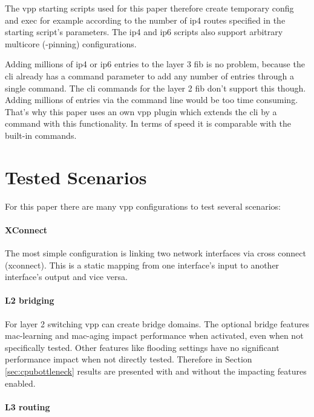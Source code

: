 The \Ac{vpp} starting scripts used for this paper therefore create
temporary \Ac{config} and \Ac{exec} for example according to the
number of \Ac{ip4} routes specified in the starting script's
parameters. The \Ac{ip4} and \Ac{ip6} scripts also support arbitrary
multicore (-pinning) configurations.


Adding millions of \Ac{ip4} or \Ac{ip6} entries to the layer 3
\Ac{fib} is no problem, because the \Ac{cli} already has a command
parameter to add any number of entries through a single command. The
\Ac{cli} commands for the layer 2 \Ac{fib} don't support this though.
Adding millions of entries via the command line would be too time
consuming. That's why this paper uses an own \Ac{vpp} plugin which
extends the \Ac{cli} by a command with this functionality. In terms of
speed it is comparable with the built-in commands.



\section{Tested Scenarios}

For this paper there are many \Ac{vpp} configurations to test several
scenarios:

\paragraph{XConnect} 

The most simple configuration is linking two network interfaces via
cross connect (xconnect). This is a static mapping from one
interface's input to another interface's output and vice versa.

\paragraph{L2 bridging}

For layer 2 switching \Ac{vpp} can create bridge domains. The optional
bridge features mac-learning and mac-aging impact performance when
activated, even when not specifically tested. Other features like
flooding settings have no significant performance impact when not
directly tested. Therefore in Section \ref{sec:cpubottleneck} results
are presented with and without the impacting features enabled.

\paragraph{L3 routing}

